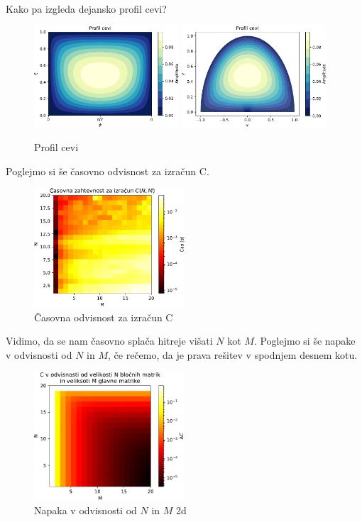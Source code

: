 Kako pa izgleda dejansko profil cevi?
\begin{figure}[h]
    \centering
    \includegraphics[width=0.48\textwidth]{pdf/cev.pdf}
    \hfill
    \includegraphics[width=0.48\textwidth]{pdf/cev1.pdf}
    \caption{Profil cevi}
\end{figure}
\newpage
Poglejmo si še časovno odvisnost za izračun C.
\begin{figure}[h]
    \centering
    \includegraphics[width=0.5\textwidth]{pdf/time(N,M).pdf}
    \caption{Časovna odvisnost za izračun C}
\end{figure}
Vidimo, da se nam časovno splača hitreje višati $N$ kot $M$.
Poglejmo si še napake v odvisnosti od $N$ in $M$, če rečemo, da je prava rešitev v spodnjem desnem kotu.
\begin{figure}[h]
    \centering
    \includegraphics[width=0.5\textwidth]{pdf/C(N,M).pdf}
    \caption{Napaka v odvisnosti od $N$ in $M$ 2d}
\end{figure}
